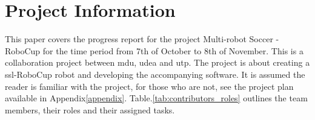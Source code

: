 \section{Project Information}

This paper covers the progress report for the project Multi-robot Soccer - RoboCup for the time period from 7th of October to 8th of November. 
This is a collaboration project between \ac{mdu}, \ac{udea} and \ac{utp}. 
The project is about creating a \ac{ssl}-RoboCup robot and developing the accompanying software.
It is assumed the reader is familiar with the project, for those who are not, see the project plan available in Appendix\:\ref{appendix}.
Table.\:\ref{tab:contributors_roles} outlines the team members, their roles and their assigned tasks.
